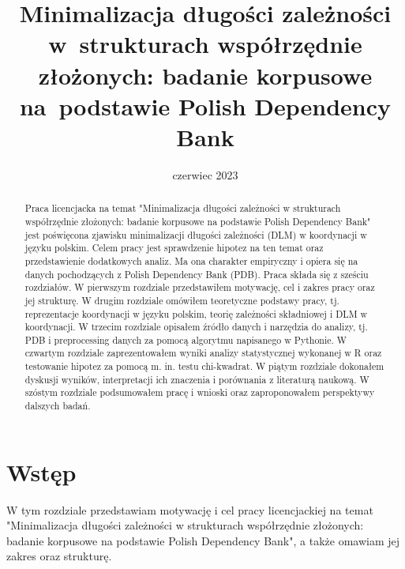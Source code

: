 \documentclass[licencjacka]{pracamgr_Kogni}
\title{Minimalizacja długości zależności w~strukturach współrzędnie złożonych: badanie korpusowe na~podstawie Polish Dependency Bank}
\date{czerwiec 2023}
\begin{document}
\maketitle


\begin{abstract}
Praca licencjacka na temat "Minimalizacja długości zależności w strukturach współrzędnie złożonych: badanie korpusowe na podstawie Polish Dependency Bank"  jest poświęcona zjawisku minimalizacji długości zależności (DLM) w koordynacji w języku polskim. Celem pracy jest sprawdzenie hipotez na ten temat oraz przedstawienie dodatkowych analiz. Ma ona charakter empiryczny i opiera się na danych pochodzących z Polish Dependency Bank (PDB). Praca składa się z sześciu rozdziałów. W pierwszym rozdziale przedstawiłem motywację, cel i zakres pracy oraz jej strukturę. W drugim rozdziale omówiłem teoretyczne podstawy pracy, tj. reprezentacje koordynacji w języku polskim, teorię zależności składniowej i DLM w koordynacji. W trzecim rozdziale opisałem źródło danych i narzędzia do analizy, tj. PDB i preprocessing
danych za pomocą algorytmu napisanego w Pythonie. W czwartym rozdziale zaprezentowałem wyniki analizy statystycznej wykonanej w R oraz testowanie hipotez za pomocą m. in. testu chi-kwadrat. W piątym rozdziale dokonałem dyskusji wyników, interpretacji ich znaczenia i porównania z literaturą naukową. W szóstym rozdziale podsumowałem pracę i wnioski oraz zaproponowałem perspektywy dalszych badań.
\end{abstract}

\thispagestyle{empty}
\setcounter{page}{3}
\tableofcontents 

\chapter{Wstęp}
W tym rozdziale przedstawiam motywację i cel pracy licencjackiej na temat "Minimalizacja długości zależności w strukturach współrzędnie złożonych: badanie korpusowe na podstawie Polish Dependency Bank", a także omawiam jej zakres oraz strukturę.
\end{document}
